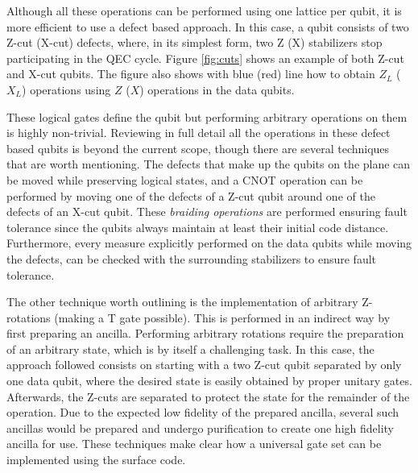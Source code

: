 Although all these operations can be performed using one lattice per qubit,
it is more efficient to use a defect based approach. In this case, a qubit
consists of two Z-cut (X-cut) defects, where, in its simplest form, two Z (X)
stabilizers stop participating in the QEC cycle. Figure \ref{fig:cuts} shows an
example of both Z-cut and X-cut qubits. The figure also shows with blue
(red) line how to obtain $Z_L$ ($X_L$) operations using $Z$ ($X$) operations in
the data qubits.

These logical gates define the qubit but performing arbitrary operations on them
is highly non-trivial. Reviewing in full detail all the operations in these
defect based qubits is beyond the current scope, though there are several
techniques that are worth mentioning. The defects that make up the qubits on the
plane can be moved while preserving logical states, and a CNOT operation can be
performed by moving one of the defects of a Z-cut qubit around one of the
defects of an X-cut qubit. These \textit{braiding operations} are performed
ensuring fault tolerance since the qubits always maintain at least their initial
code distance. Furthermore, every measure explicitly performed on the data
qubits while moving the defects, can be checked with the surrounding stabilizers
to ensure fault tolerance.

The other technique worth outlining is the implementation of arbitrary
Z-rotations (making a T gate possible). This is performed in an indirect way by
first preparing an ancilla. Performing arbitrary rotations require the
preparation of an arbitrary state, which is by itself a challenging task. In
this case, the approach followed consists on starting with a two Z-cut qubit
separated by only one data qubit, where the desired state is easily obtained by
proper unitary gates. Afterwards, the Z-cuts are separated to protect the state
for the remainder of the operation. Due to the expected low fidelity of the
prepared ancilla, several such ancillas would be prepared and undergo
purification to create one high fidelity ancilla for use. These techniques make
clear how a universal gate set can be implemented using the surface code.


